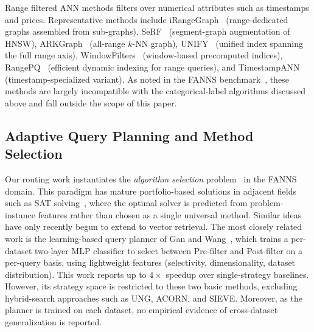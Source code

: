 Range filtered ANN methods filters 
over numerical attributes such as timestamps and prices. %
Representative methods include iRangeGraph~\cite{iRangeGraph2024} (range-dedicated graphs assembled from sub-graphs), SeRF~\cite{SeRF2024} (segment-graph augmentation of HNSW), ARKGraph~\cite{ARKGraph2023} (all-range $k$-NN graph), UNIFY~\cite{UNIFY2025} (unified index spanning the full range axis), WindowFilters~\cite{WindowFilters2024} (window-based precomputed indices), RangePQ~\cite{RangePQ2025} (efficient dynamic indexing for range queries), and TimestampANN~\cite{TimestampANN2025} (timestamp-specialized variant). As noted in the FANNS benchmark~\cite{FilteredANNBenchmark2024}, these methods are largely incompatible with the categorical-label algorithms discussed above and fall outside the scope of this paper.



\subsection{Adaptive Query Planning and Method Selection}
\label{sec:rw-routing}

Our routing work instantiates the \emph{algorithm selection} problem~\cite{Rice1976} in the FANNS domain. This paradigm has mature portfolio-based solutions in adjacent fields such as SAT solving~\cite{SATzilla2008}, where the optimal solver is predicted from problem-instance features rather than chosen as a single universal method. Similar ideas have only recently begun to extend to vector retrieval.
The most closely related work is the learning-based query planner of Gan and Wang~\cite{LearningBasedQueryPlanning2026}, which trains a per-dataset two-layer MLP classifier to select between Pre-filter and Post-filter on a per-query basis, using lightweight features (selectivity, dimensionality, dataset distribution). 
This work reports up to $4\times$ speedup over single-strategy baselines. However, its strategy space is restricted to these two basic methods, excluding hybrid-search approaches such as UNG, ACORN, and SIEVE. Moreover, as the planner is trained on each dataset, no empirical evidence of cross-dataset generalization is reported.

